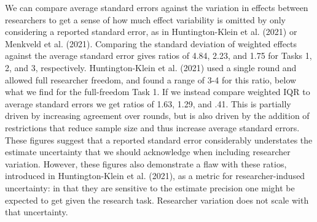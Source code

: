 \documentclass[
  letterpaper,
  DIV=11,
  numbers=noendperiod]{scrartcl}
\begin{document}
We can compare average standard errors against the variation in effects
between researchers to get a sense of how much effect variability is
omitted by only considering a reported standard error, as in
Huntington-Klein et al. (2021) or Menkveld et al. (2021). Comparing the
standard deviation of weighted effects against the average standard
error gives ratios of 4.84, 2.23, and 1.75 for Tasks 1, 2, and 3,
respectively. Huntington-Klein et al. (2021) used a single round and
allowed full researcher freedom, and found a range of 3-4 for this
ratio, below what we find for the full-freedom Task 1. If we instead
compare weighted IQR to average standard errors we get ratios of 1.63,
1.29, and .41. This is partially driven by increasing agreement over
rounds, but is also driven by the addition of restrictions that reduce
sample size and thus increase average standard errors. These figures
suggest that a reported standard error considerably understates the
estimate uncertainty that we should acknowledge when including
researcher variation. However, these figures also demonstrate a flaw
with these ratios, introduced in Huntington-Klein et al. (2021), as a
metric for researcher-indused uncertainty: in that they are sensitive to
the estimate precision one might be expected to get given the research
task. Researcher variation does not scale with that uncertainty.
\end{document}
